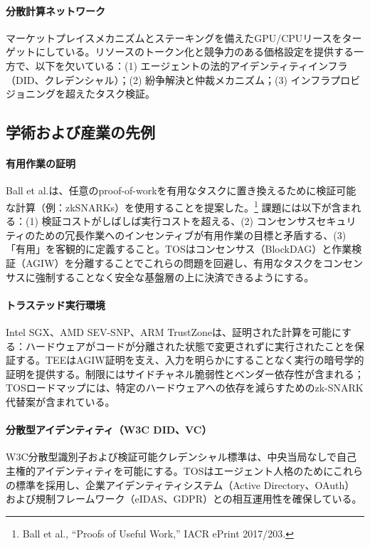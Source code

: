 \documentclass[11pt]{article}
\begin{document}
\paragraph{分散計算ネットワーク} マーケットプレイスメカニズムとステーキングを備えたGPU/CPUリースをターゲットにしている。リソースのトークン化と競争力のある価格設定を提供する一方で、以下を欠いている：(1) エージェントの法的アイデンティティインフラ（DID、クレデンシャル）；(2) 紛争解決と仲裁メカニズム；(3) インフラプロビジョニングを超えたタスク検証。

\subsection{学術および産業の先例}
\paragraph{有用作業の証明} Ball et al.は、任意のproof-of-workを有用なタスクに置き換えるために検証可能な計算（例：zkSNARKs）を使用することを提案した。\footnote{Ball et al., ``Proofs of Useful Work,'' IACR ePrint 2017/203.} 課題には以下が含まれる：(1) 検証コストがしばしば実行コストを超える、(2) コンセンサスセキュリティのための冗長作業へのインセンティブが有用作業の目標と矛盾する、(3) 「有用」を客観的に定義すること。TOSはコンセンサス（BlockDAG）と作業検証（AGIW）を分離することでこれらの問題を回避し、有用なタスクをコンセンサスに強制することなく安全な基盤層の上に決済できるようにする。

\paragraph{トラステッド実行環境} Intel SGX、AMD SEV-SNP、ARM TrustZoneは、証明された計算を可能にする：ハードウェアがコードが分離された状態で変更されずに実行されたことを保証する。TEEはAGIW証明を支え、入力を明らかにすることなく実行の暗号学的証明を提供する。制限にはサイドチャネル脆弱性とベンダー依存性が含まれる；TOSロードマップには、特定のハードウェアへの依存を減らすためのzk-SNARK代替案が含まれている。

\paragraph{分散型アイデンティティ（W3C DID、VC）} W3C分散型識別子および検証可能クレデンシャル標準は、中央当局なしで自己主権的アイデンティティを可能にする。TOSはエージェント人格のためにこれらの標準を採用し、企業アイデンティティシステム（Active Directory、OAuth）および規制フレームワーク（eIDAS、GDPR）との相互運用性を確保している。
\end{document}
